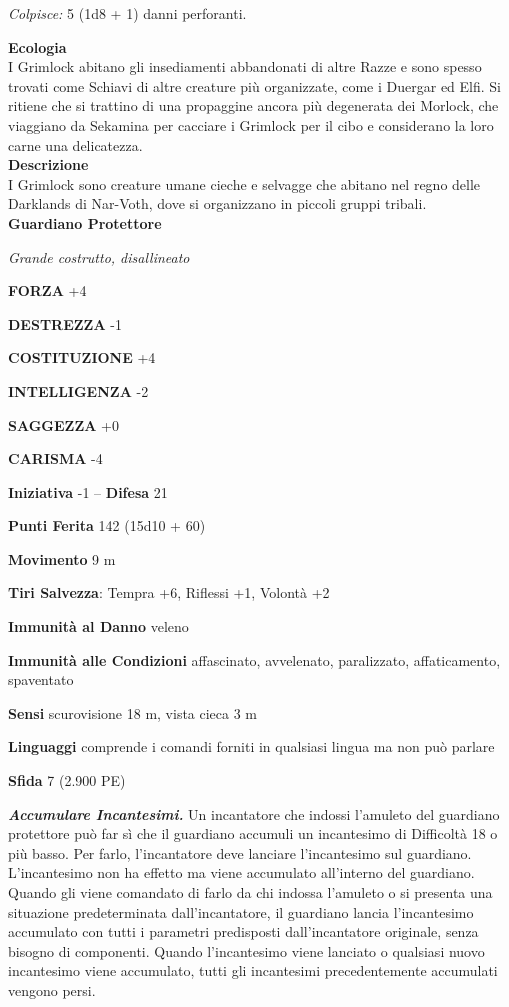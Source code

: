 \begin{multicols}{2}
\emph{Colpisce:} 5 (1d8 + 1) danni perforanti.

\textbf{Ecologia}\\
I Grimlock abitano gli insediamenti abbandonati di altre Razze e sono spesso trovati come Schiavi di altre creature più organizzate, come i Duergar ed Elfi. Si ritiene che si trattino di una propaggine ancora più degenerata dei Morlock, che viaggiano da Sekamina per cacciare i Grimlock per il cibo e considerano la loro carne una delicatezza.\\
\textbf{Descrizione}\\
I Grimlock sono creature umane cieche e selvagge che abitano nel regno delle Darklands di Nar-Voth, dove si organizzano in piccoli gruppi tribali.\\


\medskip{}\textbf{Guardiano Protettore}

\emph{Grande costrutto, disallineato}

\textbf{FORZA} +4

\textbf{DESTREZZA} -1

\textbf{COSTITUZIONE} +4

\textbf{INTELLIGENZA} -2

\textbf{SAGGEZZA} +0

\textbf{CARISMA} -4

\textbf{Iniziativa} -1 -- \textbf{Difesa} 21

\textbf{Punti Ferita} 142 (15d10 + 60)

\textbf{Movimento} 9 m

\textbf{Tiri Salvezza}: Tempra +6, Riflessi +1, Volontà +2

\textbf{Immunità al Danno} veleno

\textbf{Immunità alle Condizioni} affascinato, avvelenato, paralizzato, affaticamento, spaventato

\textbf{Sensi} scurovisione 18 m, vista cieca 3 m

\textbf{Linguaggi} comprende i comandi forniti in qualsiasi lingua ma non può parlare

\textbf{Sfida} 7 (2.900 PE)

\emph{\textbf{Accumulare Incantesimi.}} Un incantatore che indossi l'amuleto del guardiano protettore può far sì che il guardiano accumuli un incantesimo di Difficoltà 18 o più basso. Per farlo, l'incantatore deve lanciare l'incantesimo sul guardiano. L'incantesimo non ha effetto ma viene accumulato all'interno del guardiano. Quando gli viene comandato di farlo da chi indossa l'amuleto o si presenta una situazione predeterminata dall'incantatore, il guardiano lancia l'incantesimo accumulato con tutti i parametri predisposti dall'incantatore originale, senza bisogno di componenti. Quando l'incantesimo viene lanciato o qualsiasi nuovo incantesimo viene accumulato, tutti gli incantesimi precedentemente accumulati vengono persi.


\end{multicols}
